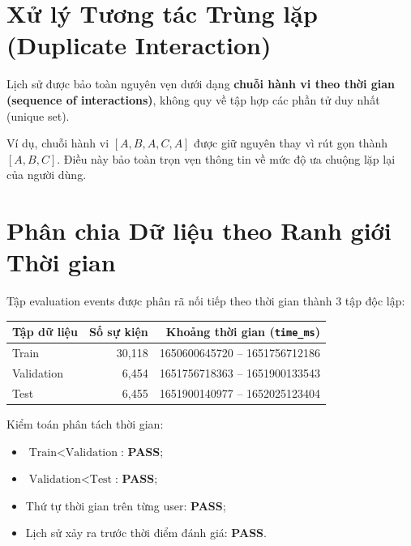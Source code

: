 \documentclass[12pt,a4paper]{article}
\begin{document}
\section{Xử lý Tương tác Trùng lặp (Duplicate Interaction)}
Lịch sử được bảo toàn nguyên vẹn dưới dạng \textbf{chuỗi hành vi theo thời gian (sequence of interactions)}, không quy về tập hợp các phần tử duy nhất (unique set). 

Ví dụ, chuỗi hành vi $[A, B, A, C, A]$ được giữ nguyên thay vì rút gọn thành $[A, B, C]$. Điều này bảo toàn trọn vẹn thông tin về mức độ ưa chuộng lặp lại của người dùng.

\section{Phân chia Dữ liệu theo Ranh giới Thời gian}
Tập evaluation events được phân rã nối tiếp theo thời gian thành 3 tập độc lập:
\begin{center}
\begin{tabular}{lrr}
\toprule
\textbf{Tập dữ liệu} & \textbf{Số sự kiện} & \textbf{Khoảng thời gian (\texttt{time\_ms})} \\
\midrule
Train       & 30,118 & 1650600645720 -- 1651756712186 \\
Validation  & 6,454  & 1651756718363 -- 1651900133543 \\
Test        & 6,455  & 1651900140977 -- 1652025123404 \\
\bottomrule
\end{tabular}
\end{center}

Kiểm toán phân tách thời gian:
\begin{itemize}[noitemsep]
    \item $\text{Train} < \text{Validation}$: \textbf{PASS};
    \item $\text{Validation} < \text{Test}$: \textbf{PASS};
    \item Thứ tự thời gian trên từng user: \textbf{PASS};
    \item Lịch sử xảy ra trước thời điểm đánh giá: \textbf{PASS}.
\end{itemize}
\end{document}

